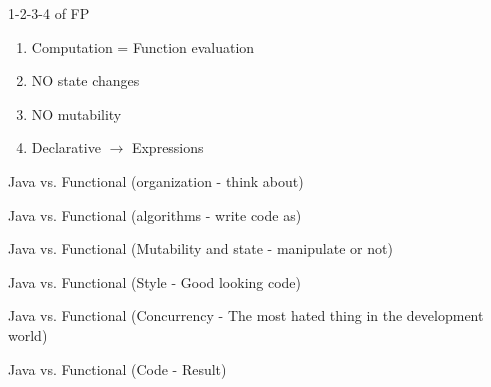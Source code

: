 \documentclass[14pt]{beamer}
\begin{document}
\begin{frame}{1-2-3-4 of FP}
	\begin{enumerate}
	\item Computation = Function evaluation
	\item NO state changes
	\item NO mutability
	\item Declarative $\to$ Expressions 
	\end{enumerate}
\end{frame}

\begin{frame}{Java vs. Functional (organization - think about)}
\end{frame}


\begin{frame}{Java vs. Functional  (algorithms - write code as)}
\end{frame}

\begin{frame}{Java vs. Functional (Mutability and state - manipulate or not)}
\end{frame}

\begin{frame}{Java vs. Functional (Style - Good looking code)}
\end{frame}

\begin{frame}{Java vs. Functional (Concurrency - The most hated thing in the development world)}
\end{frame}

\begin{frame}{Java vs. Functional (Code - Result)}
\end{frame}
\end{document}
